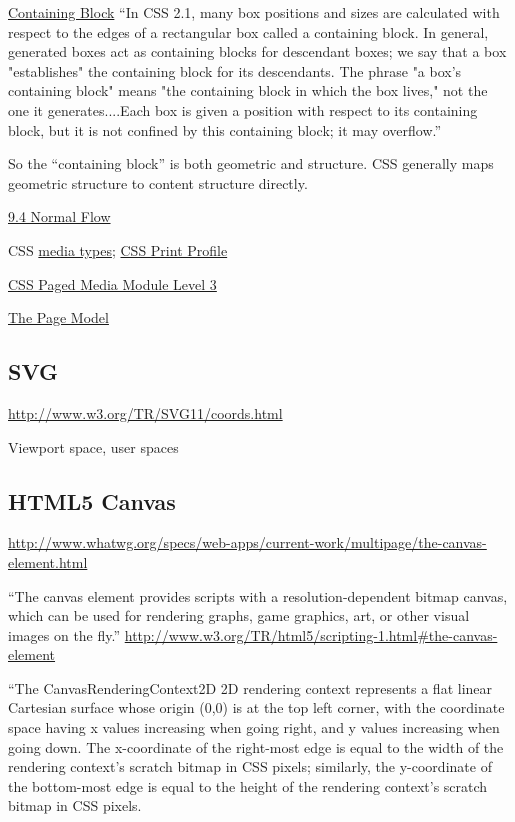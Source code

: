 \documentclass[reqno,12pt]{tufte-handout}
\numberwithin{equation}{subsection}
\numberwithin{equation}{subsection}
\begin{document}
\begin{appendices}
    \href{http://www.w3.org/TR/CSS2/visuren.html#containing-block}{Containing
      Block} ``In CSS 2.1, many box positions and sizes are calculated
    with respect to the edges of a rectangular box called a containing
    block. In general, generated boxes act as containing blocks for
    descendant boxes; we say that a box "establishes" the containing block
    for its descendants. The phrase "a box's containing block" means "the
    containing block in which the box lives," not the one it
    generates....Each box is given a position with respect to its
    containing block, but it is not confined by this containing block; it
    may overflow.''

    So the ``containing block'' is both geometric and structure.  CSS
    generally maps geometric structure to content structure directly.

    \href{http://www.w3.org/TR/CSS2/visuren.html#normal-flow}{9.4 Normal Flow}

    CSS \href{http://www.w3.org/TR/CSS2/media.html}{media types}; \href{http://www.w3.org/TR/css-print/}{CSS Print Profile}

    \href{http://www.w3.org/TR/css3-page/}{CSS Paged Media Module Level 3}

    \href{http://www.w3.org/TR/css3-page/#page-model}{The Page Model}

    \subsection{SVG}

    \url{http://www.w3.org/TR/SVG11/coords.html}

    Viewport space, user spaces

    \subsection{HTML5 Canvas}
    \label{subs:html5}

\url{http://www.whatwg.org/specs/web-apps/current-work/multipage/the-canvas-element.html}

    ``The canvas element provides scripts with a resolution-dependent bitmap canvas, which can be used for rendering graphs, game graphics, art, or other visual images on the fly.'' \url{http://www.w3.org/TR/html5/scripting-1.html#the-canvas-element}

``The CanvasRenderingContext2D 2D rendering context represents a flat linear Cartesian surface whose origin (0,0) is at the top left corner, with the coordinate space having x values increasing when going right, and y values increasing when going down. The x-coordinate of the right-most edge is equal to the width of the rendering context's scratch bitmap in CSS pixels; similarly, the y-coordinate of the bottom-most edge is equal to the height of the rendering context's scratch bitmap in CSS pixels.


\end{appendices}
\end{document}
